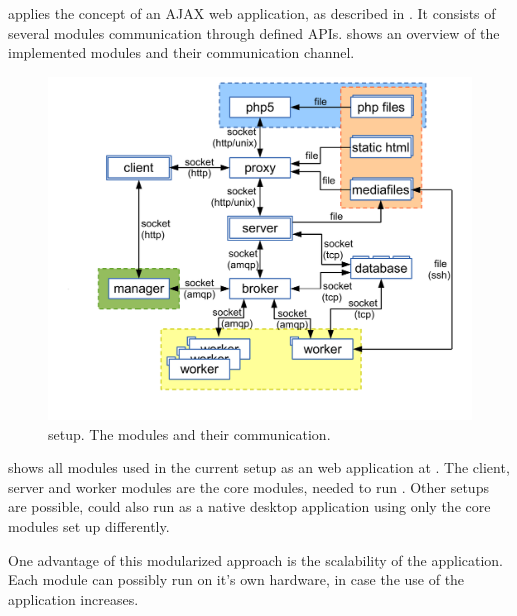 

\spl applies the concept of an AJAX web application, as described in .
It consists of several modules communication through defined APIs.
 shows an overview of the implemented modules and their communication channel.

\begin{figure}[htbp]
  \centering
    \includegraphics[width=\textwidth]{fig/whole_setup.pdf}
  \caption{\spl setup. The modules and their communication.}
  \label{fig:whole_setup}
\end{figure}


 shows all modules used in the current setup as an web application at \splurl.
The client, server and worker modules are the core modules, needed to run \spl.
Other setups are possible, \spl could also run as a native desktop application using only the core modules set up differently.

One advantage of this modularized approach is the scalability of the application.
Each module can possibly run on it's own hardware, in case the use of the application increases.

